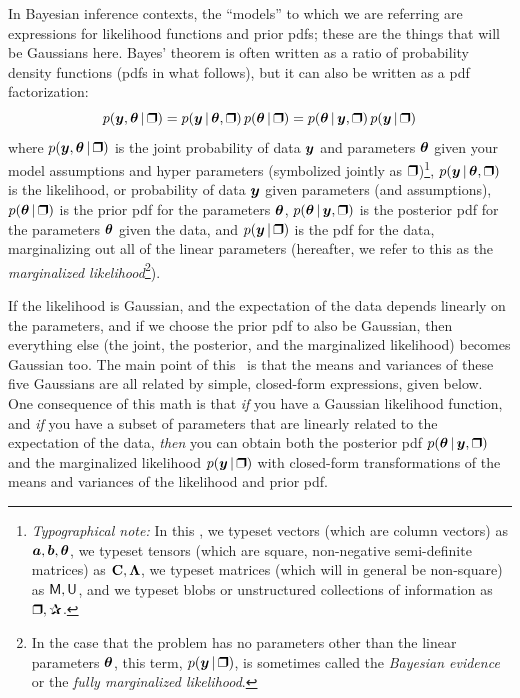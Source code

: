 In Bayesian inference contexts, the ``models'' to which we are referring are
expressions for likelihood functions and prior pdfs; these are the things
that will be Gaussians here.
Bayes' theorem is often written as a ratio of probability density functions
(pdfs in what follows), but it can also be written as a pdf factorization:
\begin{equation}
p(\vy,\vtheta\given\bH) = p(\vy\given\vtheta,\bH)\,p(\vtheta\given\bH) = p(\vtheta\given\vy,\bH)\,p(\vy\given\bH)
\end{equation}
where
$p(\vy,\vtheta\given\bH)$ is the joint probability of data $\boldsymbol{y}$ and
parameters $\boldsymbol{\theta}$ given your model assumptions and hyper parameters
(symbolized jointly as $\bH$)\footnote{%
\textsl{Typographical note:} In this \documentname, we
typeset vectors (which are column vectors) as $\boldsymbol{a}, \boldsymbol{b}, \boldsymbol{\theta}$, we typeset tensors (which
are square, non-negative semi-definite matrices) as $\mathbf{C}, \mathbf{\Lambda}$,
we typeset matrices (which will in general be non-square) as $\mathsf{M}, \mathsf{U}$,
and we typeset blobs or unstructured
collections of information as $\bH, \bP$.},
$p(\vy\given\vtheta,\bH)$ is the likelihood, or probability of data $\boldsymbol{y}$
given parameters (and assumptions),
$p(\vtheta\given\bH)$ is the prior pdf for the parameters $\boldsymbol{\theta}$,
$p(\vtheta\given\vy,\bH)$ is the posterior pdf for the parameters $\boldsymbol{\theta}$
given the data,
and
$p(\vy\given\bH)$ is the pdf for the data, marginalizing out all of the linear
parameters (hereafter, we refer to this as the \textsl{marginalized
likelihood}\footnote{In the case that the problem has no parameters other than
the linear parameters $\boldsymbol{\theta}$, this term, $p(\vy \given \bH)$, is sometimes
called the \textsl{Bayesian evidence} or the \textsl{fully marginalized
likelihood}.}).

If the likelihood is Gaussian, and the expectation of the data depends linearly
on the parameters, and if we choose the prior pdf to also be Gaussian, then
everything else (the joint, the posterior, and the marginalized likelihood)
becomes Gaussian too.
The main point of this \documentname\ is that the means and variances of these
five Gaussians are all related by simple, closed-form expressions, given below.
One consequence of this math is that \emph{if} you have a Gaussian
likelihood function, and \emph{if} you have a subset of parameters that are
linearly related to the expectation of the data, \emph{then} you can obtain both
the posterior pdf $p(\vtheta\given\vy,\bH)$ and the marginalized likelihood
$p(\vy\given\bH)$ with closed-form transformations of the means and variances of
the likelihood and prior pdf.

